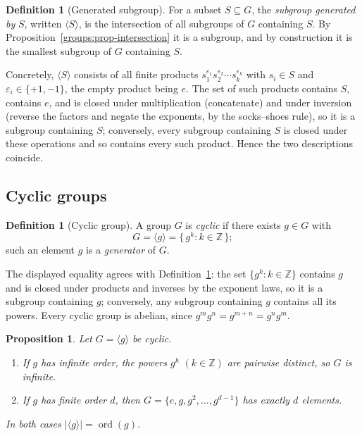 \documentclass[11pt,a4paper]{article}
\newtheorem{proposition}[theorem]{Proposition}
\theoremstyle{definition}
\newtheorem{definition}[theorem]{Definition}
\theoremstyle{remark}
\newcommand{\Z}{\ensuremath{\mathbb{Z}}}
\DeclareMathOperator{\ord}{ord}
\providecommand{\abs}[1]{\lvert #1 \rvert}
\begin{document}
\begin{definition}[Generated subgroup]\label{groups:def-generated}
For a subset \(S \subseteq G\), the \emph{subgroup generated by} \(S\),
written \(\langle S\rangle\), is the intersection of all subgroups of
\(G\) containing \(S\). By Proposition~\ref{groups:prop-intersection} it
is a subgroup, and by construction it is the smallest subgroup of \(G\)
containing \(S\).
\end{definition}

Concretely, \(\langle S\rangle\) consists of all finite products
\(s_1^{\varepsilon_1} s_2^{\varepsilon_2} \cdots s_k^{\varepsilon_k}\)
with \(s_i \in S\) and \(\varepsilon_i \in \{+1,-1\}\), the empty product
being \(e\). The set of such products contains \(S\), contains
\(e\), and is closed under multiplication (concatenate) and under
inversion (reverse the factors and negate the exponents, by the
socks--shoes rule), so it is a subgroup containing \(S\); conversely,
every subgroup containing \(S\) is closed under these operations and so
contains every such product. Hence the two descriptions coincide.

\subsection{Cyclic groups}\label{groups:sub:cyclic}

\begin{definition}[Cyclic group]\label{groups:def-cyclic}
A group \(G\) is \emph{cyclic} if there exists \(g \in G\) with
\[
G = \langle g\rangle = \{\, g^k : k \in \Z \,\};
\]
such an element \(g\) is a \emph{generator} of \(G\).
\end{definition}

The displayed equality agrees with
Definition~\ref{groups:def-generated}: the set \(\{g^k : k \in \Z\}\)
contains \(g\) and is closed under products and inverses by the exponent
laws, so it is a subgroup containing \(g\); conversely, any subgroup
containing \(g\) contains all its powers. Every
cyclic group is abelian, since \(g^m g^n = g^{m+n} = g^n g^m\).

\begin{proposition}\label{groups:prop-cyclic-order}
Let \(G = \langle g\rangle\) be cyclic.
\begin{enumerate}
\item If \(g\) has infinite order, the powers \(g^k\) \((k \in \Z)\) are
  pairwise distinct, so \(G\) is infinite.
\item If \(g\) has finite order \(d\), then
  \(G = \{e, g, g^2, \dots, g^{d-1}\}\) has exactly \(d\) elements.
\end{enumerate}
In both cases \(\abs{\langle g\rangle} = \ord(g)\).
\end{proposition}
\end{document}
